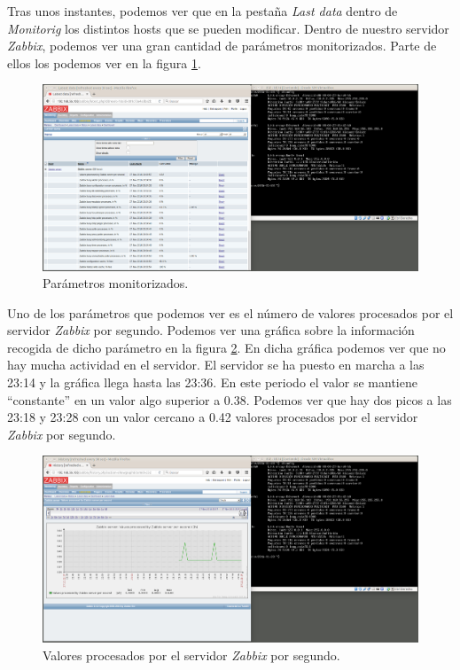 \documentclass[a4paper,titlepage,12pt]{scrartcl}	%
\numberwithin{figure}{section} %
\numberwithin{table}{section} %
\begin{document}
	Tras unos instantes, podemos ver que en la pestaña \textit{Last data} dentro de \textit{Monitorig} los distintos hosts que se pueden modificar. Dentro de nuestro servidor \textit{Zabbix}, podemos ver una gran cantidad de parámetros monitorizados. Parte de ellos los podemos ver en la figura \ref{O4-17}.
	
	\begin{figure}[H]
		\includegraphics[width=\linewidth]{./Imagenes/O4-17.png}
		\vspace{-0.5cm}
		\caption[Parámetros monitorizados.]{Parámetros monitorizados.}
		\label{O4-17}
	\end{figure}
	
	Uno de los parámetros que podemos ver es el número de valores procesados por el servidor \textit{Zabbix} por segundo. Podemos ver una gráfica sobre la información recogida de dicho parámetro en la figura \ref{O4-18}. En dicha gráfica podemos ver que no hay mucha actividad en el servidor. El servidor se ha puesto en marcha a las 23:14 y la gráfica llega hasta las 23:36. En este periodo el valor se mantiene ``constante'' en un valor algo superior a 0.38. Podemos ver que hay dos picos a las 23:18 y 23:28 con un valor cercano a 0.42 valores procesados por el servidor \textit{Zabbix} por segundo.
	
	\begin{figure}[H]
		\includegraphics[width=\linewidth]{./Imagenes/O4-18.png}
		\vspace{-0.5cm}
		\caption[Valores procesados por el servidor \textit{Zabbix} por segundo.]{Valores procesados por el servidor \textit{Zabbix} por segundo.}
		\label{O4-18}
	\end{figure}
	
\end{document}
